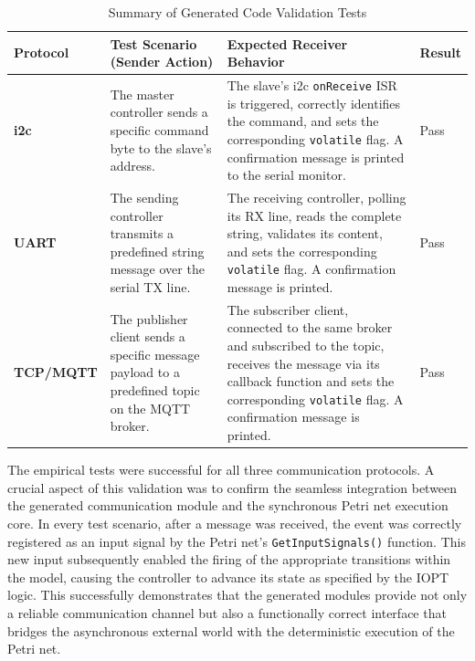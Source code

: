 \begin{table}[h!]
\centering
\caption{Summary of Generated Code Validation Tests}
\label{tab:code_validation_results}
\begin{tabular}{|l|p{4cm}|p{4cm}|p{2cm}|}
\hline
\textbf{Protocol} & \textbf{Test Scenario (Sender Action)} & \textbf{Expected Receiver Behavior} & \textbf{Result} \\ \hline
\textbf{\gls{i2c}} & The master controller sends a specific command byte to the slave's address. & The slave's \gls{i2c} \texttt{onReceive} ISR is triggered, correctly identifies the command, and sets the corresponding \texttt{volatile} flag. A confirmation message is printed to the serial monitor. & Pass \\ \hline
\textbf{UART} & The sending controller transmits a predefined string message over the serial TX line. & The receiving controller, polling its RX line, reads the complete string, validates its content, and sets the corresponding \texttt{volatile} flag. A confirmation message is printed. & Pass \\ \hline
\textbf{TCP/MQTT} & The publisher client sends a specific message payload to a predefined topic on the MQTT broker. & The subscriber client, connected to the same broker and subscribed to the topic, receives the message via its callback function and sets the corresponding \texttt{volatile} flag. A confirmation message is printed. & Pass \\ \hline
\end{tabular}
\end{table}

 The empirical tests were successful for all three communication protocols. A crucial aspect of this validation was to confirm the seamless integration between the generated communication module and the synchronous Petri net execution core. In every test scenario, after a message was received, the event was correctly registered as an input signal by the Petri net's \texttt{GetInputSignals()} function. This new input subsequently enabled the firing of the appropriate transitions within the model, causing the controller to advance its state as specified by the IOPT logic. This successfully demonstrates that the generated modules provide not only a reliable communication channel but also a functionally correct interface that bridges the asynchronous external world with the deterministic execution of the Petri net.


